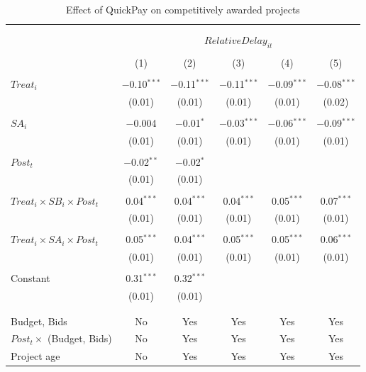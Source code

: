 \documentclass[
]{article}
\begin{document}
\begin{table}[H] \centering 
  \caption{Effect of QuickPay on competitively awarded projects} 
  \label{} 
\small 
\begin{tabular}{@{\extracolsep{-2pt}}lccccc} 
\\[-1.8ex]\hline 
\hline \\[-1.8ex] 
\\[-1.8ex] & \multicolumn{5}{c}{$RelativeDelay_{it}$  } \\ 
\\[-1.8ex] & (1) & (2) & (3) & (4) & (5)\\ 
\hline \\[-1.8ex] 
 $Treat_i$ & $-$0.10$^{***}$ & $-$0.11$^{***}$ & $-$0.11$^{***}$ & $-$0.09$^{***}$ & $-$0.08$^{***}$ \\ 
  & (0.01) & (0.01) & (0.01) & (0.01) & (0.02) \\ 
  & & & & & \\ 
 $SA_i$ & $-$0.004 & $-$0.01$^{*}$ & $-$0.03$^{***}$ & $-$0.06$^{***}$ & $-$0.09$^{***}$ \\ 
  & (0.01) & (0.01) & (0.01) & (0.01) & (0.01) \\ 
  & & & & & \\ 
 $Post_t$ & $-$0.02$^{**}$ & $-$0.02$^{*}$ &  &  &  \\ 
  & (0.01) & (0.01) &  &  &  \\ 
  & & & & & \\ 
 $Treat_i \times SB_i \times Post_t$ & 0.04$^{***}$ & 0.04$^{***}$ & 0.04$^{***}$ & 0.05$^{***}$ & 0.07$^{***}$ \\ 
  & (0.01) & (0.01) & (0.01) & (0.01) & (0.01) \\ 
  & & & & & \\ 
 $Treat_i \times SA_i \times Post_t$ & 0.05$^{***}$ & 0.04$^{***}$ & 0.05$^{***}$ & 0.05$^{***}$ & 0.06$^{***}$ \\ 
  & (0.01) & (0.01) & (0.01) & (0.01) & (0.01) \\ 
  & & & & & \\ 
 Constant & 0.31$^{***}$ & 0.32$^{***}$ &  &  &  \\ 
  & (0.01) & (0.01) &  &  &  \\ 
  & & & & & \\ 
\hline \\[-1.8ex] 
Budget, Bids & No & Yes & Yes & Yes & Yes \\ 
$Post_t \times $  (Budget, Bids) & No & Yes & Yes & Yes & Yes \\ 
Project age & No & Yes & Yes & Yes & Yes \\ 

\end{tabular}
\end{table}
\end{document}
